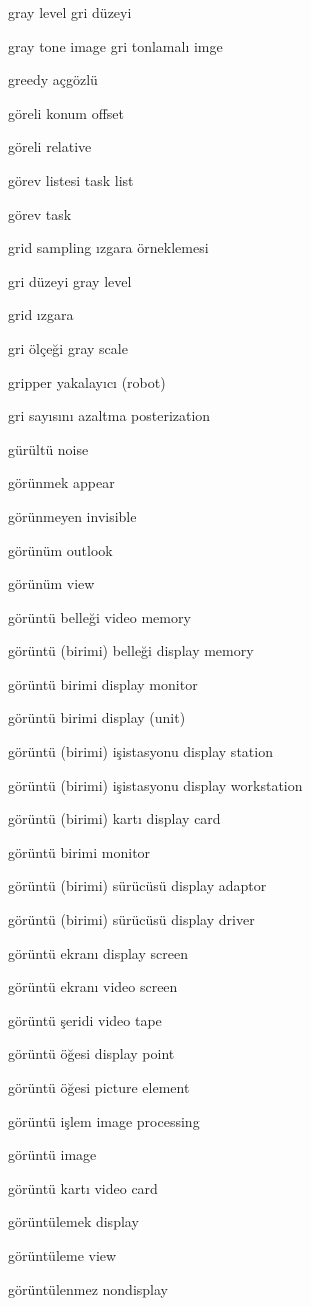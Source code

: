 \documentclass[12pt,fleqn]{article}\usepackage{../../common}
\begin{document}
gray level gri düzeyi

gray tone image gri tonlamalı imge

greedy açgözlü

göreli konum offset

göreli relative

görev listesi task list

görev task

grid sampling ızgara örneklemesi

gri düzeyi gray level

grid ızgara

gri ölçeği gray scale

gripper yakalayıcı (robot)

gri sayısını azaltma posterization

gürültü noise

görünmek appear

görünmeyen invisible

görünüm outlook

görünüm view

görüntü belleği video memory

görüntü (birimi) belleği display memory

görüntü birimi display monitor

görüntü birimi display (unit)

görüntü (birimi) işistasyonu display station

görüntü (birimi) işistasyonu display workstation

görüntü (birimi) kartı display card

görüntü birimi monitor

görüntü (birimi) sürücüsü display adaptor

görüntü (birimi) sürücüsü display driver

görüntü ekranı display screen

görüntü ekranı video screen

görüntü şeridi video tape

görüntü öğesi display point

görüntü öğesi picture element

görüntü işlem image processing

görüntü image

görüntü kartı video card

görüntülemek display

görüntüleme view

görüntülenmez nondisplay
\end{document}
